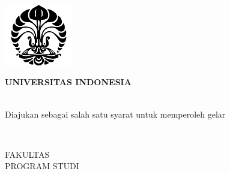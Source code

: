 \begin{titlepage}
    \begin{center}
        \includegraphics[width=3cm]{gambar/logo ui hitam.png}
        
        \bfseries
        UNIVERSITAS INDONESIA

        \vspace{1cm}
        \large
        \MakeUppercase{\judul}

        \vspace{4cm}
        
        \MakeUppercase{\jenis}\\

        \normalsize
        Diajukan sebagai salah satu syarat untuk memperoleh gelar \gelar

        \vspace{4cm}
        
        \MakeUppercase{\nama}\\
        \npm

        \vspace{5cm}
        FAKULTAS \MakeUppercase{\fakultas}\\
        PROGRAM STUDI \MakeUppercase{\prodi}\\
        \MakeUppercase{\tempat}\\
        \MakeUppercase{\bulan} \tahun
    \end{center}
    \normalfont
\end{titlepage}